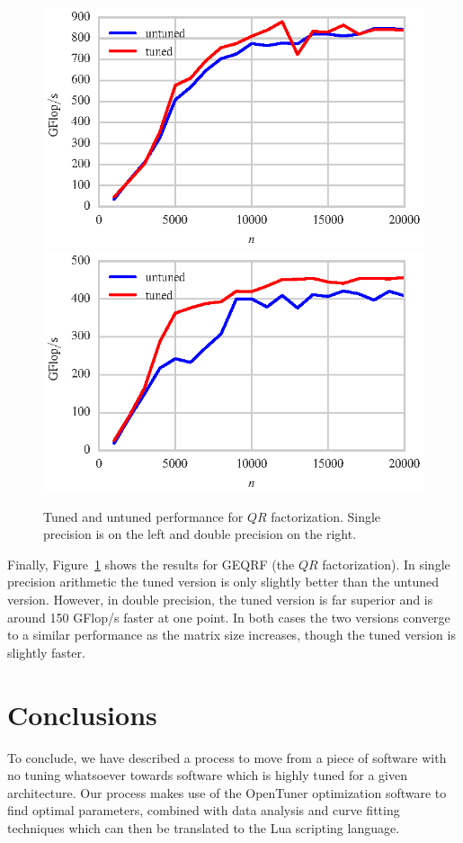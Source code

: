 \documentclass[a4paper,12pt]{article}
\begin{document}
\begin{figure}[ht]
  \centering
  \includegraphics[scale=0.85]{fig/tuned_sgeqrf.eps}
  \includegraphics[scale=0.85]{fig/tuned_dgeqrf.eps}
  \caption{Tuned and untuned performance for $QR$ factorization. Single
    precision is on the left and double precision on the right.
    \label{fig.tuned_geqrf} }
\end{figure}

Finally,
Figure~\ref{fig.tuned_geqrf} shows the results
for GEQRF (the $QR$ factorization).
In single precision arithmetic the tuned version
is only slightly better than the untuned version.
However,
in double precision,
the tuned version is far superior and is around 150 GFlop/s
faster at one point.
In both cases the two versions converge to a similar
performance as the matrix size increases,
though the tuned version is slightly faster.

\section{Conclusions}
\label{sec.conclusions}
To conclude,
we have described a process to move from a
piece of software with no tuning whatsoever
towards software which is highly tuned for a given architecture.
Our process makes use of the OpenTuner optimization
software to find optimal parameters,
combined with data analysis and curve fitting techniques
which can then be translated to the Lua scripting language.
\end{document}
